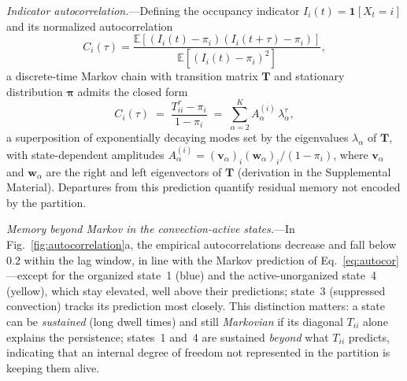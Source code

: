 \documentclass[
    aps,
    prl,
    reprint,
    superscriptaddress,
    amsmath,amssymb,
    floatfix,
    nofootinbib
]{revtex4-2}
\begin{document}
\emph{Indicator autocorrelation.}---Defining the occupancy indicator $I_i(t) = \mathbf{1}[X_t = i]$ and its normalized autocorrelation
\begin{equation}
C_i(\tau) =
\frac{\mathbb{E}\!\left[(I_i(t)-\pi_i)(I_i(t+\tau)-\pi_i)\right]}
     {\mathbb{E}\!\left[(I_i(t)-\pi_i)^2\right]},
\end{equation}
a discrete-time Markov chain with transition matrix $\mathbf{T}$ and stationary distribution $\boldsymbol{\pi}$ admits the closed form \cite{souza2024representing}
\begin{equation}
C_i(\tau) \;=\; \frac{T^\tau_{ii} - \pi_i}{1-\pi_i}
\;=\; \sum_{\alpha=2}^K A_\alpha^{(i)}\, \lambda_\alpha^\tau,
\label{eq:autocor}
\end{equation}
a superposition of exponentially decaying modes set by the eigenvalues $\lambda_\alpha$ of $\mathbf{T}$, with state-dependent amplitudes $A_\alpha^{(i)} = (\mathbf{v}_\alpha)_i (\mathbf{w}_\alpha)_i / (1-\pi_i)$, where $\mathbf{v}_\alpha$ and $\mathbf{w}_\alpha$ are the right and left eigenvectors of $\mathbf{T}$ (derivation in the Supplemental Material). Departures from this prediction quantify residual memory not encoded by the partition.

\emph{Memory beyond Markov in the convection-active states.}---In Fig.~\ref{fig:autocorrelation}a, the empirical autocorrelations decrease and fall below $0.2$ within the lag window, in line with the Markov prediction of Eq.~\eqref{eq:autocor}---except for the organized state~1 (blue) and the active-unorganized state~4 (yellow), which stay elevated, well above their predictions; state~3 (suppressed convection) tracks its prediction most closely. This distinction matters: a state can be \emph{sustained} (long dwell times) and still \emph{Markovian} if its diagonal $T_{ii}$ alone explains the persistence; states~1 and~4 are sustained \emph{beyond} what $T_{ii}$ predicts, indicating that an internal degree of freedom not represented in the partition is keeping them alive.
\end{document}
